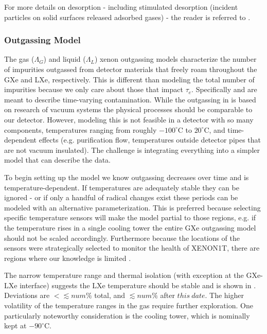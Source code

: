 For more details on desorption - including stimulated desorption (incident particles on solid surfaces released adsorbed gases) - the
reader is referred to .



\subsubsection{Outgassing Model}
\label{subsubsec:electron_lifetime_model_outgassing_model}
The gas ($\Lambda_G$) and liquid ($\Lambda_L$) xenon outgassing models characterize the number of impurities outgassed from detector
materials that freely roam throughout
the GXe and LXe, respectively.  This is different than modeling the total number of impurities because we only care about those
that impact $\tau_e$.  Specifically \outg and \outl are meant to describe time-varying contamination.  While the outgassing in
 is based on research of vacuum systems the physical processes should be
comparable to our detector.  However, modeling this is not feasible in a detector with so
many components, temperatures ranging from roughly $-100^{\circ} \mathrm{C}$ to $20^{\circ} \mathrm{C}$, and time-dependent effects (e.g.
purification flow, temperatures outside detector pipes that are not vacuum insulated).  The challenge is integrating everything into
a simpler model that can describe the data.

To begin setting up the model we know outgassing decreases over time and is temperature-dependent.  If temperatures
are adequately stable they can be ignored - or if only a handful of radical changes exist these periods can be modeled with an
alternative parameterization.  This is preferred because selecting specific temperature sensors will make the model
partial to those regions, e.g. if the temperature rises in a single cooling tower the entire GXe outgassing model should not be scaled
accordingly.  Furthermore because the locations of the sensors were strategically selected to monitor the health of XENON1T, there are
regions where our knowledge is limited .

The narrow temperature range and thermal isolation (with exception at the GXe-LXe interface)
suggests the LXe temperature should be stable and is shown in .  Deviations are
$< \lesssim num\%$ total, and $\lesssim num\%$ after $this\ date$.  The higher volatility of the temperature ranges in the gas require
further exploration.  One particularly noteworthy consideration is the  cooling tower, which is nominally kept at
$-90^{\circ}\mathrm{C}$.

